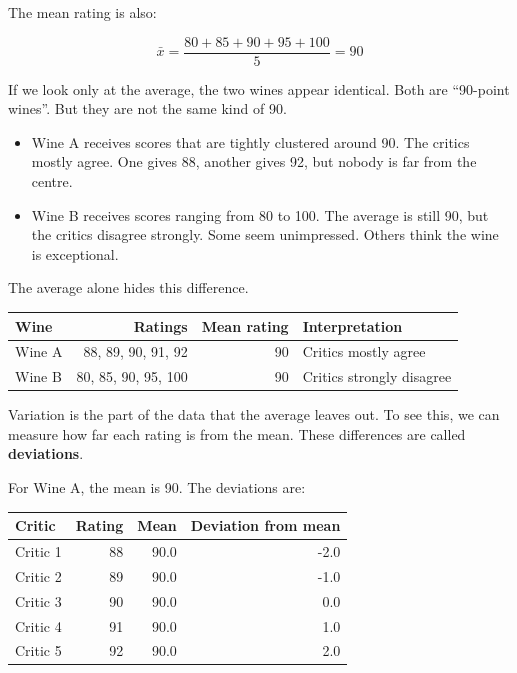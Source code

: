 \documentclass[
  letterpaper,
  DIV=11,
  numbers=noendperiod]{scrreprt}
\providecommand{\tightlist}{%
  \setlength{\itemsep}{0pt}\setlength{\parskip}{0pt}}
\begin{document}
The mean rating is also:

\[
\bar{x} =
\frac{80 + 85 + 90 + 95 + 100}{5}
= 90
\]

If we look only at the average, the two wines appear identical. Both are
``90-point wines''. But they are not the same kind of 90.

\begin{itemize}
\tightlist
\item
  Wine A receives scores that are tightly clustered around 90. The
  critics mostly agree. One gives 88, another gives 92, but nobody is
  far from the centre.
\item
  Wine B receives scores ranging from 80 to 100. The average is still
  90, but the critics disagree strongly. Some seem unimpressed. Others
  think the wine is exceptional.
\end{itemize}

The average alone hides this difference.

\begin{table}
\fontsize{12.0pt}{14.0pt}\selectfont
\begin{tabular*}{\linewidth}{@{\extracolsep{\fill}}lrrl}
\toprule
Wine & Ratings & Mean rating & Interpretation \\ 
\midrule\addlinespace[2.5pt]
Wine A & 88, 89, 90, 91, 92 & 90 & Critics mostly agree \\ 
Wine B & 80, 85, 90, 95, 100 & 90 & Critics strongly disagree \\ 
\bottomrule
\end{tabular*}
\end{table}

Variation is the part of the data that the average leaves out. To see
this, we can measure how far each rating is from the mean. These
differences are called \textbf{deviations}.

For Wine A, the mean is 90. The deviations are:

\begin{table}
\fontsize{12.0pt}{14.0pt}\selectfont
\begin{tabular*}{\linewidth}{@{\extracolsep{\fill}}lrrr}
\toprule
Critic & Rating & Mean & Deviation from mean \\ 
\midrule\addlinespace[2.5pt]
Critic 1 & 88 & 90.0 & -2.0 \\ 
Critic 2 & 89 & 90.0 & -1.0 \\ 
Critic 3 & 90 & 90.0 & 0.0 \\ 
Critic 4 & 91 & 90.0 & 1.0 \\ 
Critic 5 & 92 & 90.0 & 2.0 \\ 
\bottomrule
\end{tabular*}
\end{table}
\end{document}
